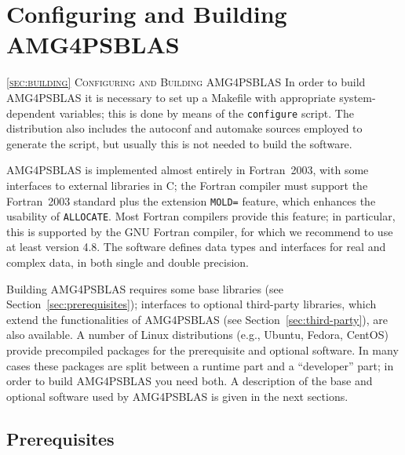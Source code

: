 \section{Configuring and Building AMG4PSBLAS\label{sec:building}}
         {\textsc{\ref{sec:building} Configuring and Building AMG4PSBLAS}}
In order to build AMG4PSBLAS it is necessary to set up a Makefile with appropriate
system-dependent variables; this is done by means of the \verb|configure|
script. The distribution also includes the autoconf and automake
sources employed to generate the script, but usually this is not needed
to build the software.

AMG4PSBLAS is implemented almost entirely in Fortran~2003, with some
interfaces to external libraries in C; the Fortran compiler
must support the Fortran~2003 standard plus the extension \verb|MOLD=|
feature, which enhances the usability of \verb|ALLOCATE|.
Most Fortran compilers provide  this feature; in particular, this is
supported by the GNU Fortran compiler, for which we
recommend to use at least version 4.8.
The software defines data types and interfaces for
real and complex data, in both single and double precision.

Building AMG4PSBLAS requires some base libraries (see
Section~\ref{sec:prerequisites}); interfaces to optional third-party
libraries, which extend the functionalities of AMG4PSBLAS (see
Section~\ref{sec:third-party}), are also available.  A number of Linux
distributions (e.g., Ubuntu, Fedora, CentOS) provide precompiled
packages for the prerequisite and optional software. In many cases
these packages are split between a runtime part and a ``developer''
part; in order to build AMG4PSBLAS you need both. A description of the
base and optional software used by AMG4PSBLAS is given in the next sections.

\subsection{Prerequisites\label{sec:prerequisites}}

